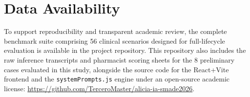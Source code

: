 \documentclass[9pt,conference]{IEEEtran}
\begin{document}
\section*{Data Availability}
To support reproducibility and transparent academic review, the complete benchmark suite comprising 56 clinical scenarios designed for full-lifecycle evaluation is available in the project repository. This repository also includes the raw inference transcripts and pharmacist scoring sheets for the 8 preliminary cases evaluated in this study, alongside the source code for the React+Vite frontend and the \texttt{systemPrompts.js} engine under an open-source academic license: \url{https://github.com/TerceroMaster/alicia-ia-smade2026}.





\end{document}
